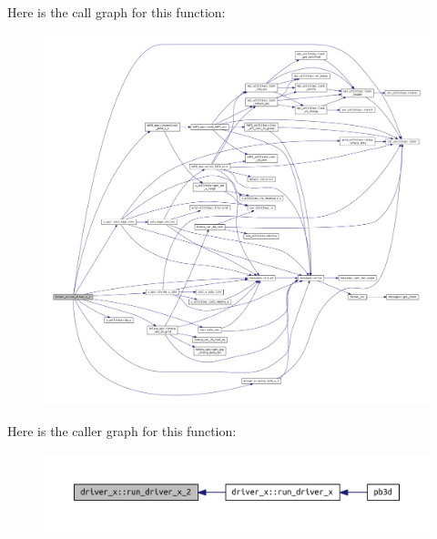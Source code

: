 Here is the call graph for this function\+:
\nopagebreak
\begin{figure}[H]
\begin{center}
\leavevmode
\includegraphics[width=350pt]{namespacedriver__x_ad3924b3d66f336f0a9a9559eafffec8e_cgraph}
\end{center}
\end{figure}
Here is the caller graph for this function\+:
\nopagebreak
\begin{figure}[H]
\begin{center}
\leavevmode
\includegraphics[width=350pt]{namespacedriver__x_ad3924b3d66f336f0a9a9559eafffec8e_icgraph}
\end{center}
\end{figure}
